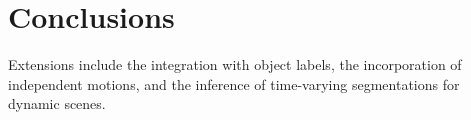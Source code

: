 \section{Conclusions}

Extensions include the integration with object labels, the incorporation of independent motions, and the inference of time-varying segmentations for
dynamic scenes.
